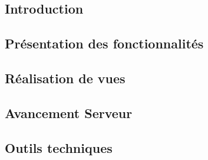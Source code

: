 

\subsection{Introduction}


\subsection{Présentation des fonctionnalités}




\subsection{Réalisation de vues}


\subsection{Avancement Serveur}


\subsection{Outils techniques}


